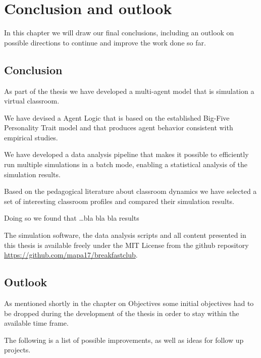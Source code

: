 \chapter{Conclusion and outlook}
In this chapter we will draw our final conclusions, including an outlook on
possible directions to continue and improve the work done so far.

\section{Conclusion}
As part of the thesis we have developed a multi-agent model that is simulation a virtual classroom.

We have devised a Agent Logic that is based on the established Big-Five Personality
Trait model and that produces agent behavior consistent with empirical studies.

We have developed a data analysis pipeline that makes it possible to efficiently
run multiple simulations in a batch mode, enabling a statistical analysis of the
simulation results.

Based on the pedagogical literature about classroom dynamics we have selected a
set of interesting classroom profiles and compared their simulation results.

Doing so we found that \dots bla bla bla results

The simulation software, the data analysis scripts and all content presented in this
thesis is available freely under the MIT License from the github repository \href{https://github.com/mapa17/breakfastclub}{https://github.com/mapa17/breakfastclub}.



\section{Outlook}
As mentioned shortly in the chapter on Objectives some initial objectives had to
be dropped during the development of the thesis in order to stay within the available
time frame.

The following is a list of possible improvements, as well as ideas for follow up projects.

